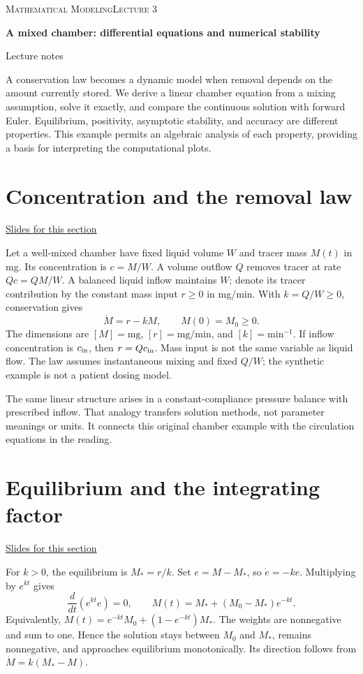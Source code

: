 \documentclass[11pt,letterpaper]{article}
\theoremstyle{definition}\newtheorem{definition}{Definition}\newtheorem{example}{Example}
\numberwithin{equation}{section}
\begin{document}
{\small\scshape Mathematical Modeling\hfill Lecture 3}\par\medskip
{\raggedright{}\LARGE\bfseries\color{ink} A mixed chamber: differential equations and numerical stability\par}\medskip
{\small Lecture notes}\par\bigskip
A conservation law becomes a dynamic model when removal depends on the amount currently stored. We derive a linear chamber equation from a mixing assumption, solve it exactly, and compare the continuous solution with forward Euler. Equilibrium, positivity, asymptotic stability, and accuracy are different properties. This example permits an algebraic analysis of each property, providing a basis for interpreting the computational plots.

\section{Concentration and the removal law}
\hypertarget{note-concentration-and-the-removal-law}{}\label{note:concentration-and-the-removal-law}
{\small \href{slides.html\#frame=mixing-and-mass-outflow\&step=1}{Slides for this section}}\par
Let a well-mixed chamber have fixed liquid volume $W$ and tracer mass $M(t)$ in mg. Its concentration is $c=M/W$. A volume outflow $Q$ removes tracer at rate $Qc=QM/W$. A balanced liquid inflow maintains $W$; denote its tracer contribution by the constant mass input $r\geq0$ in mg/min. With $k=Q/W\geq0$, conservation gives
\[
\boxed{\dot M=r-kM,\qquad M(0)=M_0\geq0.}
\]
The dimensions are $[M]=\mathrm{mg}$, $[r]=\mathrm{mg}/\mathrm{min}$, and $[k]=\mathrm{min}^{-1}$. If inflow concentration is $c_{\rm in}$, then $r=Qc_{\rm in}$. Mass input is not the same variable as liquid flow. The law assumes instantaneous mixing and fixed $Q/W$; the synthetic example is not a patient dosing model.

The same linear structure arises in a constant-compliance pressure balance with prescribed inflow. That analogy transfers solution methods, not parameter meanings or units. It connects this original chamber example with the circulation equations in the reading.
\section{Equilibrium and the integrating factor}
\hypertarget{note-equilibrium-and-the-integrating-factor}{}\label{note:equilibrium-and-the-integrating-factor}
{\small \href{slides.html\#frame=equilibrium-and-direction-of-motion\&step=1}{Slides for this section}}\par
For $k>0$, the equilibrium is $M_*=r/k$. Set $e=M-M_*$, so $\dot e=-ke$. Multiplying by $e^{kt}$ gives
\[
\frac{d}{dt}(e^{kt}e)=0,\qquad
\boxed{M(t)=M_*+(M_0-M_*)e^{-kt}.}
\]
Equivalently, $M(t)=e^{-kt}M_0+(1-e^{-kt})M_*$. The weights are nonnegative and sum to one. Hence the solution stays between $M_0$ and $M_*$, remains nonnegative, and approaches equilibrium monotonically. Its direction follows from $\dot M=k(M_*-M)$.
\end{document}
